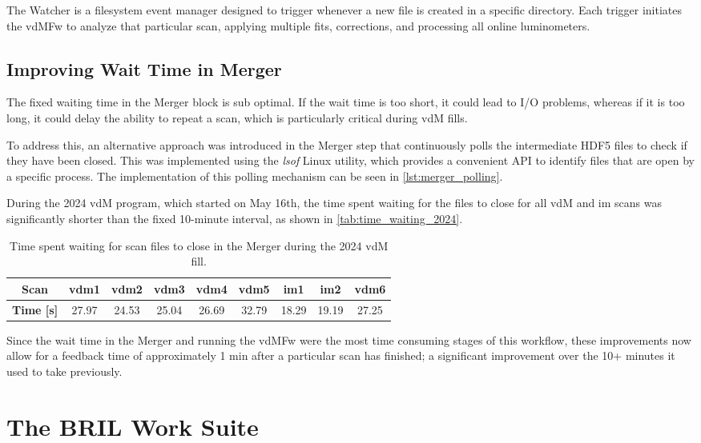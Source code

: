 The Watcher is a filesystem event manager designed to trigger whenever a new file is created in a specific directory. Each trigger initiates the vdMFw to analyze that particular scan, applying multiple fits, corrections, and processing all online luminometers.

\subsection{Improving Wait Time in Merger}

The fixed waiting time in the Merger block is sub optimal. If the wait time is too short, it could lead to I/O problems, whereas if it is too long, it could delay the ability to repeat a scan, which is particularly critical during vdM fills.

To address this, an alternative approach was introduced in the Merger step that continuously polls the intermediate HDF5 files to check if they have been closed. This was implemented using the \textit{lsof} Linux utility, which provides a convenient API to identify files that are open by a specific process. The implementation of this polling mechanism can be seen in \autoref{lst:merger_polling}.

During the 2024 vdM program, which started on May 16th, the time spent waiting for the files to close for all vdM and im scans was significantly shorter than the fixed 10-minute interval, as shown in \autoref{tab:time_waiting_2024}.

\begin{table}[!htb]
	\centering
	\caption{Time spent waiting for scan files to close in the Merger during the 2024 vdM fill.}
	\begin{tabular}{|c|c|c|c|c|c|c|c|c|}
		\hline
		\textbf{Scan}     & vdm1  & vdm2  & vdm3  & vdm4  & vdm5  & im1   & im2   & vdm6  \\
		\hline
		\textbf{Time [s]} & 27.97 & 24.53 & 25.04 & 26.69 & 32.79 & 18.29 & 19.19 & 27.25 \\
		\hline
	\end{tabular}
	\label{tab:time_waiting_2024}
\end{table}

Since the wait time in the Merger and running the vdMFw were the most time consuming stages of this workflow, these improvements now allow for a feedback time of approximately 1 min after a particular scan has finished; a significant improvement over the 10+ minutes it used to take previously.
 

\section{The BRIL Work Suite}
\label{sec:the_bril_work_suite}

